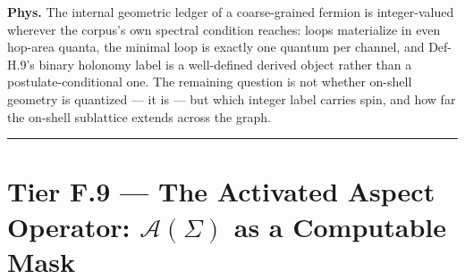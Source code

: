 \begin{theorem}
\textbf{Phys.} The internal geometric ledger of a coarse-grained fermion is integer-valued wherever the corpus's own spectral condition reaches: loops materialize in even hop-area quanta, the minimal loop is exactly one quantum per channel, and Def-H.9's binary holonomy label is a well-defined derived object rather than a postulate-conditional one. The remaining question is not whether on-shell geometry is quantized — it is — but which integer label carries spin, and how far the on-shell sublattice extends across the graph.

\vspace{2pt}\noindent\rule{\textwidth}{0.4pt}\vspace{2pt}

\end{theorem}

\section[Tier F.9 — The Activated Aspect Operator: $\mathcal A(\Sigma)$ as a Computable Mask]{\texorpdfstring{Tier F.9 — The Activated Aspect Operator: $\mathcal A(\Sigma)$ as a Computable Mask}{Tier F.9 - The Activated Aspect Operator: as a Computable Mask}}

